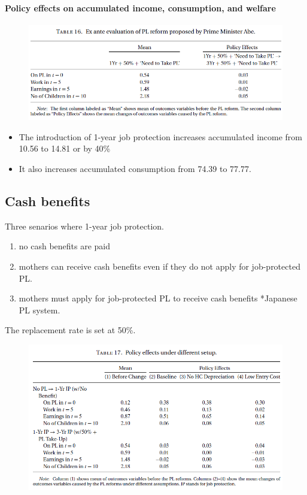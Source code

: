 \documentclass[../root]{subfiles}
\begin{document}
    \paragraph{Policy effects on accumulated income, consumption, and welfare}

    \begin{figure}[h]
      \centering
      \includegraphics[scale = 1]{0619tanji/T16}
      \label{T16}
    \end{figure}

    \begin{itemize}
      \item The introduction of 1-year job protection increases accumulated income from 10.56 to 14.81 or by 40\%
      \item It also increases accumulated consumption from 74.39 to 77.77.
    \end{itemize}


    \subsection{Cash benefits}

    Three senarios where 1-year job protection.

    \begin{enumerate}
      \item no cash benefits are paid
      \item mothers can receive cash benefits even if they do not apply for job-protected PL.
      \item mothers must apply for job-protected PL to receive cash benefits  *Japanese PL system.
    \end{enumerate}

    The replacement rate is set at 50\%.

    \begin{figure}[h]
      \centering
      \includegraphics[scale = 1]{0619tanji/T17}
      \label{T17}
    \end{figure}
\end{document}
